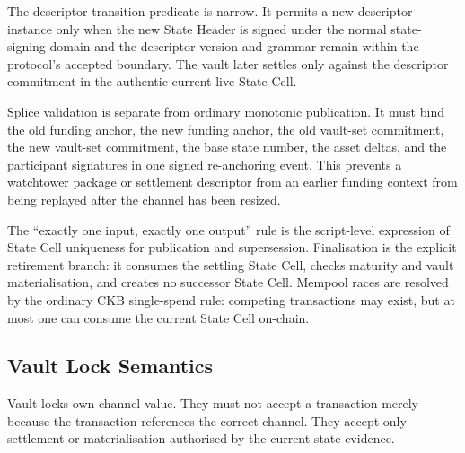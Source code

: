 \documentclass[a4paper,11pt]{article}
\begin{document}
The descriptor transition predicate is narrow. It permits a new
descriptor instance only when the new State Header is signed under the normal
state-signing domain and the descriptor version and grammar remain within the
protocol's accepted boundary. The vault later settles only against the
descriptor commitment in the authentic current live State Cell.

Splice validation is separate from ordinary monotonic publication. It must bind
the old funding anchor, the new funding anchor, the old vault-set commitment,
the new vault-set commitment, the base state number, the asset deltas, and the
participant signatures in one signed re-anchoring event. This prevents a
watchtower package or settlement descriptor from an earlier funding context
from being replayed after the channel has been resized.

The ``exactly one input, exactly one output'' rule is the script-level
expression of State Cell uniqueness for publication and supersession.
Finalisation is the explicit retirement branch: it consumes the settling State
Cell, checks maturity and vault materialisation, and creates no successor State
Cell. Mempool races are resolved by the ordinary CKB single-spend rule:
competing transactions may exist, but at most one can consume the current State
Cell on-chain.

\subsection{Vault Lock Semantics}

Vault locks own channel value. They must not accept a transaction merely because the transaction references the correct channel. They accept only settlement or materialisation authorised by the current state evidence.
\end{document}
